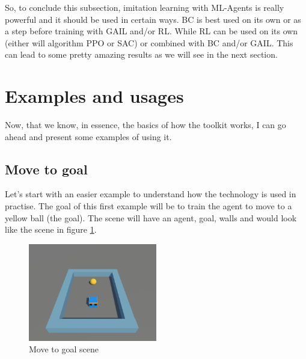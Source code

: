\documentclass[a4paper, 12pt]{book}
\begin{document}
So, to conclude this subsection, imitation learning with ML-Agents is really powerful and it should be used in certain ways. BC is best used on its own or as a step before training with GAIL and/or RL. While RL can be used on its own (either will algorithm PPO or SAC) or combined with BC and/or GAIL. This can lead to some pretty amazing results as we will see in the next section.

\section{Examples and usages}

Now, that we know, in essence, the basics of how the toolkit works, I can go ahead and present some examples of using it.

\subsection{Move to goal}

Let's start with an easier example to understand how the technology is used in practise. The goal of this first example will be to train the agent to move to a yellow ball (the goal). The scene will have an agent, goal, walls and would look like the scene in figure \ref{pic8}. 

\begin{figure}[h]
\begin{center}
\includegraphics[width=0.5\textwidth]{Images/MoveToGoal.png}
\end{center}
\caption{Move to goal scene}
\label{pic8}
\end{figure}
\end{document}
